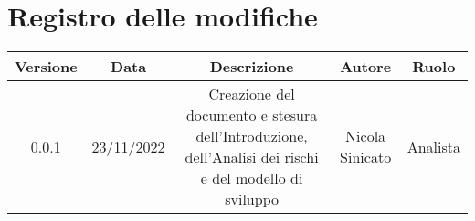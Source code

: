 \section*{Registro delle modifiche}
\begin{center}
\begin{tabular}{| c | c | c | c | c |} 
\hline
 \textbf{Versione} & \textbf{Data} & \textbf{Descrizione} & \textbf{Autore} & \textbf{Ruolo}\\
 \hline
0.0.1 & 23/11/2022 & Creazione del documento e stesura dell'Introduzione, dell'Analisi dei rischi e del modello di sviluppo & Nicola Sinicato & Analista\\
 \hline
\end{tabular}
\end{center}
